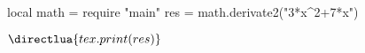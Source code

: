 \documentclass{article}
\begin{document}
\begin{luacode}    
    local math = require "main"
    res = math.derivate2("3*x^2+7*x")
\end{luacode}

$\directlua{tex.print(res)}$
\end{document}
